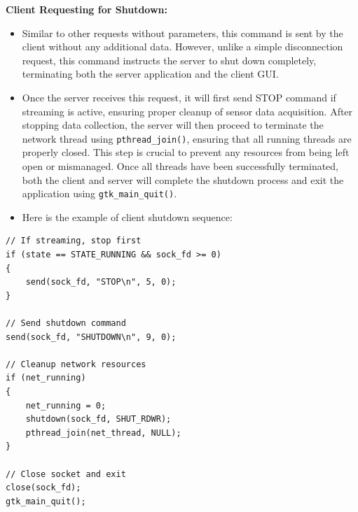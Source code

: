 \textbf{Client Requesting for Shutdown:}
\begin{itemize}
\item Similar to other requests without parameters, this command is sent by the client without any additional data. However, unlike a simple disconnection request, this command instructs the server to shut down completely, terminating both the server application and the client GUI.
\item Once the server receives this request, it will first send STOP command if streaming is active, ensuring proper cleanup of sensor data acquisition. After stopping data collection, the server will then proceed to terminate the network thread using \texttt{pthread\_join()}, ensuring that all running threads are properly closed. This step is crucial to prevent any resources from being left open or mismanaged. Once all threads have been successfully terminated, both the client and server will complete the shutdown process and exit the application using \texttt{gtk\_main\_quit()}.
\item Here is the example of client shutdown sequence:
\end{itemize}
\begin{verbatim}
// If streaming, stop first
if (state == STATE_RUNNING && sock_fd >= 0)
{
    send(sock_fd, "STOP\n", 5, 0);
}

// Send shutdown command
send(sock_fd, "SHUTDOWN\n", 9, 0);

// Cleanup network resources
if (net_running)
{
    net_running = 0;
    shutdown(sock_fd, SHUT_RDWR);
    pthread_join(net_thread, NULL);
}

// Close socket and exit
close(sock_fd);
gtk_main_quit();
\end{verbatim}